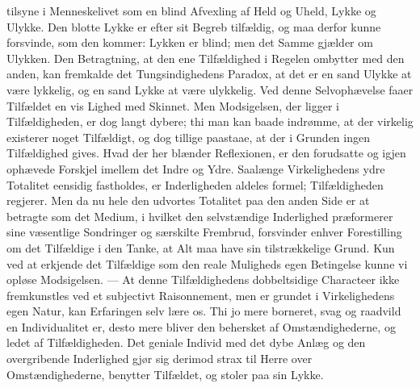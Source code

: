\documentclass[12pt]{book}
\newcommand{\opage}[1]{\marginnote{\footnotesize\textit{[#1]}}}
\begin{document}
tilsyne i Menneskelivet som en blind Afvexling af Held og Uheld, Lykke og Ulykke. Den blotte
Lykke er efter sit Begreb tilfældig, og maa derfor kunne forsvinde, som den kommer: Lykken er
blind; men det Samme gjælder om Ulykken. Den Betragtning, at den ene Tilfældighed i Regelen
ombytter med den anden, kan fremkalde det Tungsindighedens Paradox, at det er en sand Ulykke
at være lykkelig, og en sand Lykke at være ulykkelig. Ved denne Selvophævelse faaer Tilfældet
en vis Lighed med Skinnet. Men Modsigelsen, der ligger i Tilfældigheden, er dog langt dybere;
thi man kan baade indrømme, at der virkelig existerer noget Tilfældigt, og dog tillige
paastaae, at der i Grunden ingen Tilfældighed gives. Hvad der her blænder Reflexionen, er den
forudsatte og igjen ophævede Forskjel imellem det Indre og Ydre. Saalænge Virkelighedens ydre
Totalitet eensidig fastholdes, er Inderligheden aldeles formel; Tilfældigheden regjerer. Men
da nu hele den udvortes Totalitet paa den anden Side er at betragte som det Medium, i hvilket
den selvstændige Inderlighed præformerer sine væsentlige Sondringer og særskilte Frembrud,
forsvinder enhver Forestilling om det Tilfældige i den Tanke, at Alt maa have sin
tilstrækkelige Grund. Kun ved at erkjende det Tilfældige som den reale Muligheds egen
Betingelse kunne vi opløse Modsigelsen. --- At denne Tilfældighedens dobbeltsidige Characteer
ikke fremkunstles ved et subjectivt Raisonnement, men er grundet i Virkelighedens egen Natur,
kan Erfaringen selv lære os. Thi jo mere borneret, svag og raadvild en Individualitet er,
\opage{152} desto mere bliver den behersket af Omstændighederne, og ledet af Tilfældigheden. Det geniale
Individ med det dybe Anlæg og den overgribende Inderlighed gjør sig derimod strax til Herre
over Omstændighederne, benytter Tilfældet, og stoler paa sin Lykke.
\end{document}
